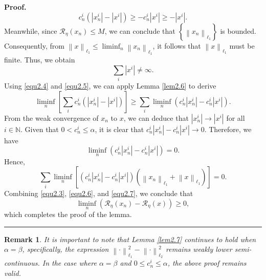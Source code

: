 \documentclass[a4paper,12pt]{article}
\newtheorem{remark}[theorem]{Remark}
\numberwithin{equation}{section}
\newenvironment{proof}[1][Proof]{\textbf{#1.} }
{\ \rule{0.75em}{0.75em}\smallskip}
\begin{document}
\begin{proof}
\begin{equation}
        c_{n}^{i}\left(\left|x_{n}^{i}\right|-\left|x^{i}\right|\right)\geq -c_{n}^{i}\left|x^{i}\right| \geq -\left|x^{i}\right|.
    \end{equation}
    Meanwhile, since $\mathcal{R}_{\eta}(x_{n})\leq M$, we can conclude that $\left\{\left\| x_{n}\right\|_{\ell_{1}}\right\}$ is bounded. Consequently, from $\left\|x\right\|_{\ell_{1}}\leq\liminf_{n}\left\|x_{n}\right\|_{\ell_{1}}$, it follows that $\left\|x\right\|_{\ell_{1}}$ must be finite. Thus, we obtain
    \begin{equation}\label{equ2.5}
        \sum_{i}\left|x^{i}\right|\neq\infty.
    \end{equation}
    Using \eqref{equ2.4} and \eqref{equ2.5}, we can apply Lemma \ref{lem2.6} to derive
    \begin{equation}\label{equ2.6}
        \liminf_{n}\left[\sum_{i}c_{n}^{i}\left(\left|x_{n}^{i}\right|-\left|x^{i}\right|\right)\right] \geq\sum_{i}\liminf_{n}\left(c_{n}^{i}\left|x_{n}^{i}\right|-c_{n}^{i}\left|x^{i}\right|\right).
    \end{equation}
    From the weak convergence of $x_{n}$ to $x$, we can deduce that $\left|x_{n}^{i}\right|\rightarrow \left|x^{i}\right|$ for all $i\in\mathbb{N}$. Given that $0<c_{n}^{i}\leq\alpha$, it is clear that $c_{n}^{i}\left|x_{n}^{i}\right|-c_{n}^{i}\left|x^{i}\right|\rightarrow 0$. Therefore, we have
    \begin{equation*}
        \liminf_{n}\left(c_{n}^{i}\left|x_{n}^{i}\right|-c_{n}^{i}\left|x^{i}\right|\right)=0.
    \end{equation*} 
    Hence,
    \begin{equation}\label{equ2.7}
        \sum_{i}\liminf_{n} \left[\left(c_{n}^{i}\left|x_{n}^{i}\right|-c_{n}^{i}\left|x^{i}\right|\right) \left(\left\|x_{n}\right\|_{\ell_{1}}+\left\|x\right\|_{\ell_{1}}\right)\right]=0.
    \end{equation}
    Combining \eqref{equ2.3}, \eqref{equ2.6}, and \eqref{equ2.7}, we conclude that
    \begin{equation*}
        \liminf_{n}\left(\mathcal{R}_{\eta}(x_{n})-\mathcal{R}_{\eta}(x)\right)\geq 0,
    \end{equation*}
    which completes the proof of the lemma.
\end{proof}

\begin{remark}\label{rem2.8}
    It is important to note that Lemma \ref{lem2.7} continues to hold when $\alpha=\beta$, specifically, the expression $\left\|\cdot\right\|_{\ell_{1}}^{2}-\left\|\cdot\right\|_{\ell_{2}}^{2}$ remains weakly lower semi-continuous. In the case where $\alpha=\beta$ and $0\leq c_{n}^{i}\leq\alpha$, the above proof remains valid.
\end{remark}
\end{document}
